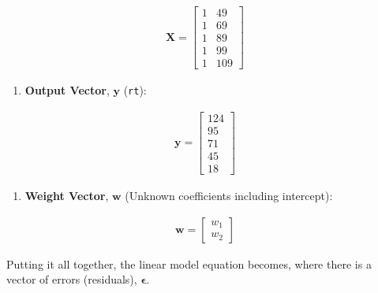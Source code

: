 \documentclass[
  letterpaper,
  DIV=11,
  numbers=noendperiod]{scrartcl}
\providecommand{\tightlist}{%
  \setlength{\itemsep}{0pt}\setlength{\parskip}{0pt}}\usepackage{longtable,booktabs,array}
\begin{document}
\[
\begin{aligned}
   \mathbf{X} = \begin{bmatrix}
   1 & 49 \\
   1 & 69 \\
   1 & 89 \\
   1 & 99 \\
   1 & 109
   \end{bmatrix}
\end{aligned}
\]

\begin{enumerate}
\def\labelenumi{\arabic{enumi}.}
\setcounter{enumi}{1}
\tightlist
\item
  \textbf{Output Vector}, \(\mathbf{y}\) (\texttt{rt}):
\end{enumerate}

\[
\begin{aligned}
   \mathbf{y} = \begin{bmatrix}
   124 \\
   95 \\
   71 \\
   45 \\
   18
   \end{bmatrix}
\end{aligned}
\]

\begin{enumerate}
\def\labelenumi{\arabic{enumi}.}
\setcounter{enumi}{2}
\tightlist
\item
  \textbf{Weight Vector}, \(\mathbf{w}\) (Unknown coefficients including
  intercept):
\end{enumerate}

\[
\begin{aligned}
   \mathbf{w} = \begin{bmatrix}
   w_1 \\  %
   w_2   %
   \end{bmatrix}
\end{aligned}
\]

Putting it all together, the linear model equation becomes, where there
is a vector of errors (residuals), \(\mathbf{\epsilon}\).
\end{document}
